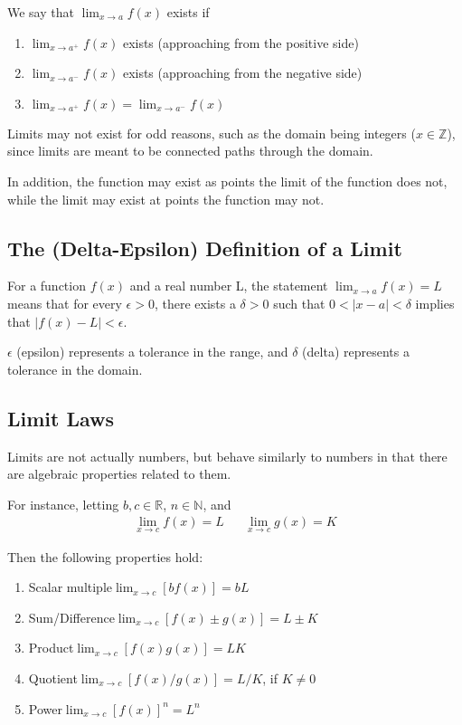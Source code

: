 \documentclass{article}
\begin{document}
We say that $\lim_{x\to a}\limits f(x)$ exists if
\begin{enumerate}
    \item $\lim_{x\to a^+}\limits f(x)$ exists (approaching from the positive side)
    \item $\lim_{x\to a^-}\limits f(x)$ exists (approaching from the negative side)
    \item $\lim_{x\to a^+}\limits f(x) = \lim_{x\to a^-}\limits f(x)$
\end{enumerate}

Limits may not exist for odd reasons, such as the domain being integers ($x\in\mathbb{Z}$), since limits are meant to be connected paths through the domain.

In addition, the function may exist as points the limit of the function does not, while the limit may exist at points the function may not.

\subsection{The (Delta-Epsilon) Definition of a Limit}
For a function $f(x)$ and a real number L, the statement $\lim_{x\to a}\limits f(x) = L$ means that for every $\epsilon > 0$, there exists a $\delta > 0$ such that $0 < |x-a| < \delta$ implies that $|f(x) - L| < \epsilon$.

$\epsilon$ (epsilon) represents a tolerance in the range, and $\delta$ (delta) represents a tolerance in the domain.

\subsection{Limit Laws}\label{limit-laws}
Limits are not actually numbers, but behave similarly to numbers in that there are algebraic properties related to them.

For instance, letting $b,c \in \mathbb{R}$, $n \in \mathbb{N}$, and
\begin{align*}
    \lim_{x\to c} f(x) = L  & & \lim_{x \to c} g(x) = K
\end{align*}

Then the following properties hold:
\begin{enumerate}
    \item Scalar multiple\quad$\lim_{x\to c}\limits\left[bf(x)\right] = bL$
    \item Sum/Difference\quad$\lim_{x\to c}\limits\left[f(x)\pm g(x)\right] = L \pm K$
    \item Product\quad$\lim_{x\to c}\limits\left[f(x)g(x)\right] = LK$
    \item Quotient\quad$\lim_{x\to c}\limits\left[f(x) / g(x)\right] = L / K$, if $K\ne 0$
    \item Power\quad$\lim_{x\to c}\limits\left[f(x)\right]^n = L^n$
\end{enumerate}
\end{document}

